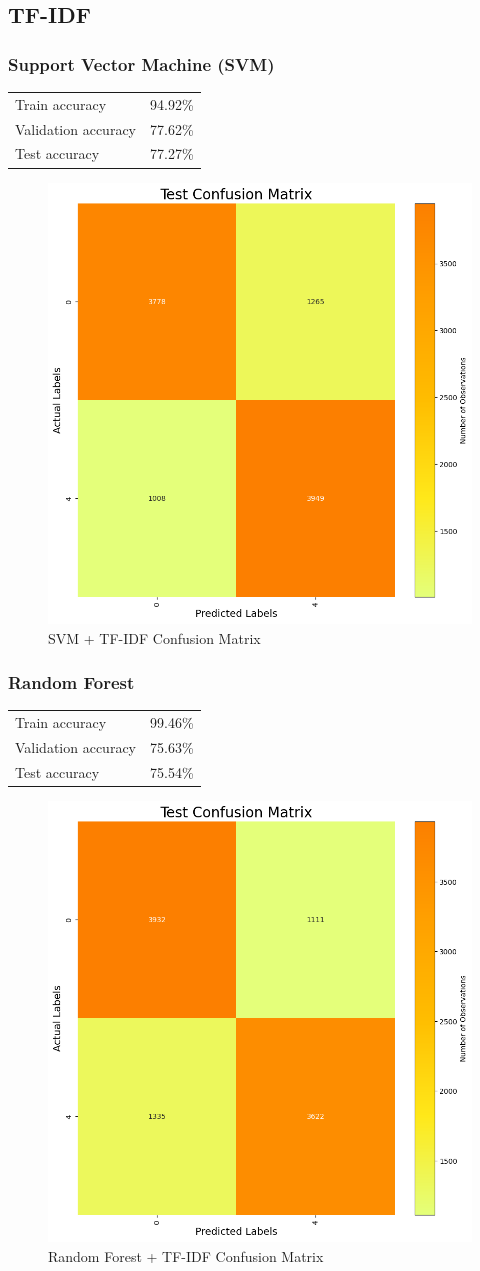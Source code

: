 \documentclass[12pt]{article}
\begin{document}
\subsection{TF-IDF}

\subsubsection{Support Vector Machine (SVM)}

\begin{tabular}{lr}
    Train accuracy & 94.92\%\\
    Validation accuracy & 77.62\%\\
    Test accuracy & 77.27\%\\
\end{tabular}

\begin{figure}[h!]
    \centering
    \includegraphics[width=.3\textwidth]{P2.TFIDF.1.png}
    \caption{SVM + TF-IDF Confusion Matrix}
    \label{fig:2.TDIDF.1}
\end{figure}

\subsubsection{Random Forest}

\begin{tabular}{lr}
    Train accuracy & 99.46\%\\
    Validation accuracy & 75.63\%\\
    Test accuracy & 75.54\%\\
\end{tabular}

\begin{figure}[h!]
    \centering
    \includegraphics[width=.3\textwidth]{P2.TFIDF.2.png}
    \caption{Random Forest + TF-IDF Confusion Matrix}
    \label{fig:2.TFIDF.2}
\end{figure}
\end{document}
